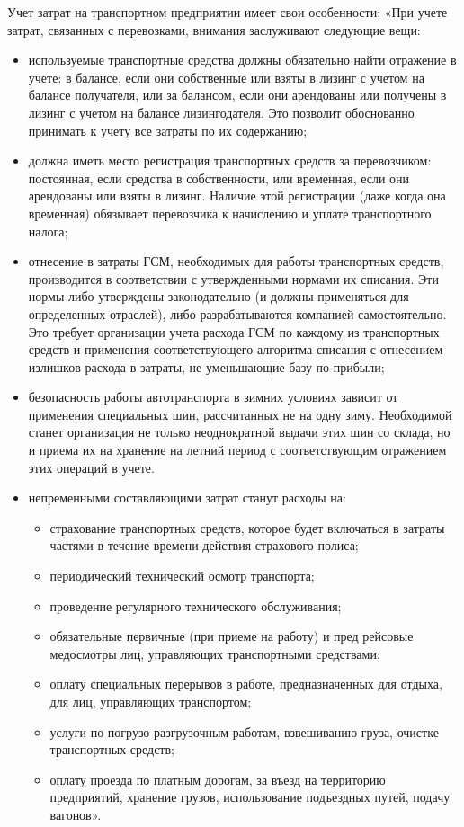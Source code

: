 Учет затрат на транспортном предприятии имеет свои особенности: «При учете
затрат, связанных с перевозками, внимания заслуживают следующие вещи:

\begin{itemize}
    \item используемые транспортные средства должны обязательно найти отражение
		в учете: в балансе, если они собственные или взяты в лизинг с учетом на
		балансе получателя, или за балансом, если они арендованы или получены в
		лизинг с учетом на балансе лизингодателя. Это позволит обоснованно
		принимать к учету все затраты по их содержанию;
	\item должна иметь место регистрация транспортных средств за перевозчиком:
		постоянная, если средства в собственности, или временная, если они
		арендованы или взяты в лизинг. Наличие этой регистрации (даже когда она
		временная) обязывает перевозчика к начислению и уплате транспортного
		налога;
	\item отнесение в затраты ГСМ, необходимых для работы транспортных средств,
		производится в соответствии с утвержденными нормами их списания. Эти
		нормы либо утверждены законодательно (и должны применяться для
		определенных отраслей), либо разрабатываются компанией самостоятельно.
		Это требует организации учета расхода ГСМ по каждому из транспортных
		средств и применения соответствующего алгоритма списания с отнесением
		излишков расхода в затраты, не уменьшающие базу по прибыли;
	\item безопасность работы автотранспорта в зимних условиях зависит от
		применения специальных шин, рассчитанных не на одну зиму. Необходимой
		станет организация не только неоднократной выдачи этих шин со склада, но
		и приема их на хранение на летний период с соответствующим отражением
		этих операций в учете.
	\item непременными составляющими затрат станут расходы на:
	
	\begin{itemize}
	    \item страхование транспортных средств, которое будет включаться в
			затраты частями в течение времени действия страхового полиса;
		\item периодический технический осмотр транспорта;
		\item проведение регулярного технического обслуживания;
		\item обязательные первичные (при приеме на работу) и пред рейсовые
			медосмотры лиц, управляющих транспортными средствами;
		\item оплату специальных перерывов в работе, предназначенных для отдыха,
			для лиц, управляющих транспортом;
		\item услуги по погрузо-разгрузочным работам, взвешиванию груза, очистке
			транспортных средств;
		\item оплату проезда по платным дорогам, за въезд на территорию
			предприятий, хранение грузов, использование подъездных путей, подачу
			вагонов».
	\end{itemize}
\end{itemize}
